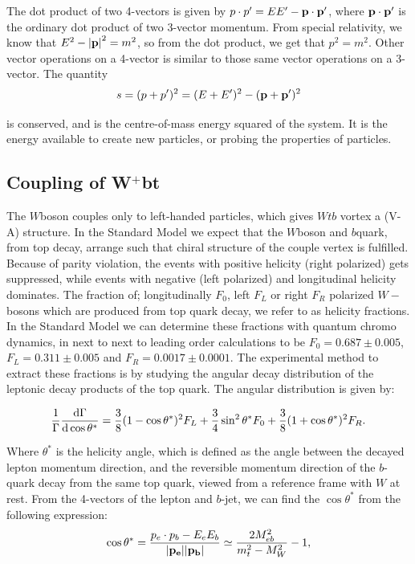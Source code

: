 \documentclass[11pt,a4paper]{article}
\begin{document}
The dot product of two 4-vectors is given by $p\cdot p' = E E' - \vb p \cdot \vb{p'}$,
where $\vb p \cdot \vb{p'}$ is the ordinary dot product of two 3-vector momentum.
From special relativity, we know that $E^2 - \abs{\vb p}^2 = m^2$, so from the
dot product, we get that $p^2 = m^2$. Other vector operations on a 4-vector is
similar to those same vector operations on a 3-vector. The quantity
\begin{equation}
s = (p + p')^2 = (E + E')^2 - (\vb p + \vb p')^2
\end{equation}

is conserved, and is the centre-of-mass energy squared of the system. It is the
energy available to create new particles, or probing the properties of
particles.

\subsection{Coupling of W$^+$bt}
The $W$boson couples only to left-handed particles, which gives $Wtb$ vortex a
(V-A) structure. In the Standard Model we expect that the $W$boson and $b$quark,
from top decay, arrange such that chiral structure of the couple vertex is
fulfilled. Because of parity violation, the events with positive helicity (right
polarized) gets suppressed, while events with negative (left polarized) and
longitudinal helicity dominates. The fraction of; longitudinally $F_0$, left
$F_L$ or right $F_R$ polarized $W-$bosons which are produced from top quark
decay, we refer to as helicity fractions. In the Standard Model we can determine
these fractions with quantum chromo dynamics, in next to next to leading order
calculations to be $F_0 = 0.687 \pm 0.005$, $F_L = 0.311 \pm 0.005$ and
$F_R = 0.0017 \pm 0.0001$. The experimental method to extract these fractions is
by studying the angular decay distribution of the leptonic decay products of the
top quark. The angular distribution is given by:

\begin{equation}
  \frac{1}{\Gamma}\dv{\Gamma}{\cos \theta^*} = \frac{3}{8}(1-\cos \theta^*)^2 F_L +
  \frac{3}{4}\sin^2 \theta^* F_0 + \frac{3}{8}(1+\cos \theta^*)^2 F_R.
\end{equation}

Where $\theta^*$ is the helicity angle, which is defined as the angle between the
decayed lepton momentum direction, and the reversible momentum direction of the
$b$-quark decay from the same top quark, viewed from a reference frame with $W$
at rest. From the 4-vectors of the lepton and $b$-jet, we can find the
$\cos \theta^*$ from the following expression:
\begin{equation}
  \cos \theta^* = \frac{p_e \cdot p_b - E_e E_b}{\abs{\vb{p_e}} \abs{\vb{p_b}}} \simeq
  \frac{2 M_{eb}^2}{m_t^2 - M_W^2} - 1,
\end{equation}
\end{document}
